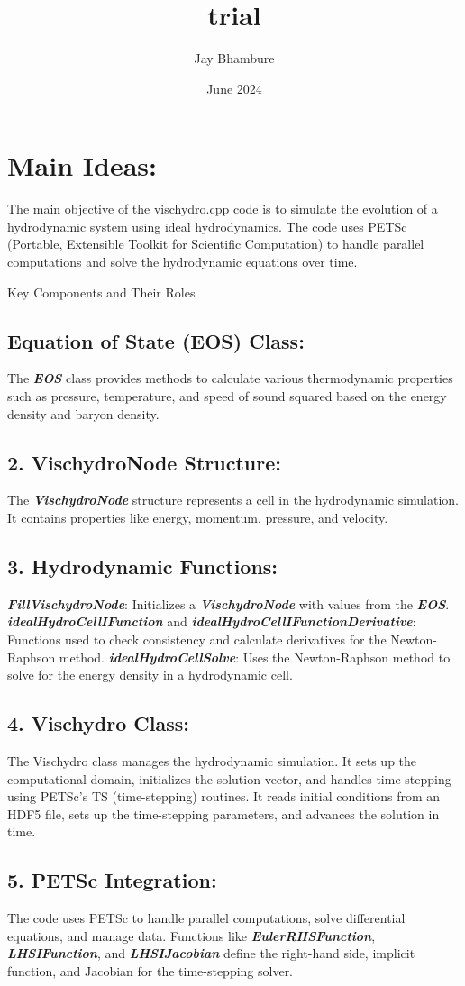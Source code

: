 \documentclass{article}
\title{trial}
\author{Jay Bhambure}
\date{June 2024}
\begin{document}
\section{Main Ideas:}
The main objective of the vischydro.cpp code is to simulate the evolution of a hydrodynamic system using ideal hydrodynamics. The code uses PETSc (Portable, Extensible Toolkit for Scientific Computation) to handle parallel computations and solve the hydrodynamic equations over time.

Key Components and Their Roles \\
\subsection{Equation of State (EOS) Class:
}
The \textbf{\textit{EOS}} class provides methods to calculate various thermodynamic properties such as pressure, temperature, and speed of sound squared based on the energy density and baryon density.
\subsection{2. VischydroNode Structure:
}
The \textit{\textbf{VischydroNode}} structure represents a cell in the hydrodynamic simulation. It contains properties like energy, momentum, pressure, and velocity.
\subsection{3. Hydrodynamic Functions:
}
\textit{\textbf{FillVischydroNode}}: Initializes a \textit{\textbf{VischydroNode}} with values from the \textit{\textbf{EOS}}.
\textbf{\textit{idealHydroCellIFunction}} and \textbf{\textit{idealHydroCellIFunctionDerivative}}: Functions used to check consistency and calculate derivatives for the Newton-Raphson method.
\textbf{\textit{idealHydroCellSolve}}: Uses the Newton-Raphson method to solve for the energy density in a hydrodynamic cell.
\subsection{4. Vischydro Class:
}
The Vischydro class manages the hydrodynamic simulation. It sets up the computational domain, initializes the solution vector, and handles time-stepping using PETSc's TS (time-stepping) routines.
It reads initial conditions from an HDF5 file, sets up the time-stepping parameters, and advances the solution in time.
\subsection{5. PETSc Integration:
}
The code uses PETSc to handle parallel computations, solve differential equations, and manage data.
Functions like \textbf{\textit{EulerRHSFunction}}, \textbf{\textit{LHSIFunction}}, and \textbf{\textit{LHSIJacobian}} define the right-hand side, implicit function, and Jacobian for the time-stepping solver.
\end{document}
